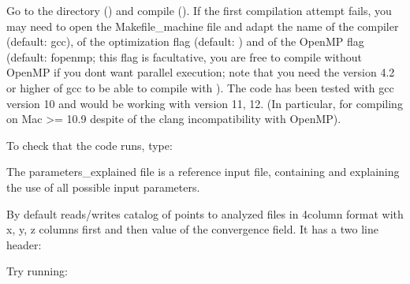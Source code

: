 \documentclass[letterpaper,10pt,english]{sphinxmanual}
\begin{document}
\sphinxAtStartPar
Go to the  directory () and compile (). If the first compilation attempt fails, you may need to open the Makefile\_machine file and adapt the name of the compiler (default: gcc), of the optimization flag (default: ) and of the OpenMP flag (default: \sphinxhyphen{}fopenmp; this flag is facultative, you are free to compile without OpenMP if you don\textquotesingle{}t want parallel execution; note that you need the version 4.2 or higher of gcc to be able to compile with ). The code has been tested with gcc version 10 and would be working with version 11, 12. (In particular, for compiling on Mac \textgreater{}= 10.9 despite of the clang incompatibility with OpenMP).

\sphinxAtStartPar
To check that the code runs, type:

\begin{sphinxVerbatim}[commandchars=\\\{\}]
 
 
\end{sphinxVerbatim}

\sphinxAtStartPar
The parameters\_explained file is a reference input file, containing and explaining the use of all possible input parameters.

\sphinxAtStartPar
By default  reads/writes catalog of points to analyzed files in 4\sphinxhyphen{}column format with x, y, z columns first and then value of the convergence field. It has a two line header:

\begin{sphinxVerbatim}[commandchars=\\\{\}]
\end{sphinxVerbatim}

\sphinxAtStartPar
Try running:

\begin{sphinxVerbatim}[commandchars=\\\{\}]
    
\end{sphinxVerbatim}
\end{document}
